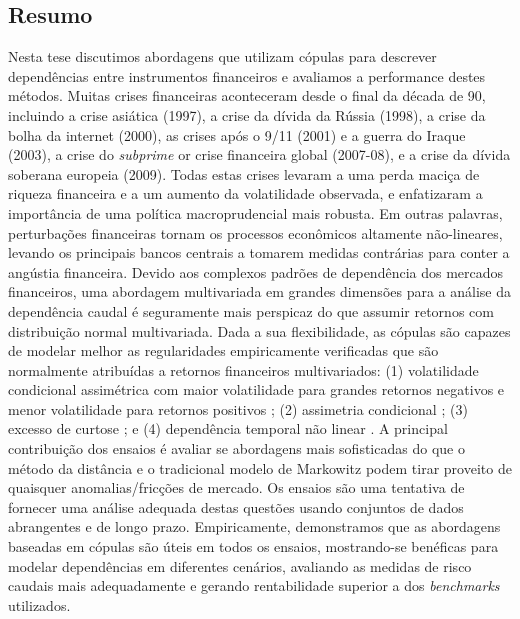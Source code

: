 \documentclass[a4paper,12pt]{report}
\begin{document}
		
	\thispagestyle{empty}
	
	\setlength{\baselineskip}{24pt}
	
	
	\clearpage
	
	
	
	\begin{center}
		\section*{Resumo}
	\end{center}
	\thispagestyle{empty}
	
	\setlength{\baselineskip}{12pt}
	\noindent Nesta tese discutimos abordagens que utilizam cópulas para descrever dependências entre instrumentos financeiros e avaliamos a performance destes métodos. Muitas crises financeiras aconteceram desde o final da década de 90, incluindo a crise asiática (1997), a crise da dívida da Rússia (1998), a crise da bolha da internet (2000), as crises após o 9/11 (2001) e a guerra do Iraque (2003), a crise do \emph{subprime} or crise financeira global (2007-08), e a crise da dívida soberana europeia (2009). Todas estas crises levaram a uma perda maciça de riqueza financeira e a um aumento da volatilidade observada, e enfatizaram a importância de uma política macroprudencial mais robusta. Em outras palavras, perturbações financeiras tornam os processos econômicos altamente não-lineares, levando os principais bancos centrais a tomarem medidas contrárias para conter a angústia financeira. Devido aos complexos padrões de dependência dos mercados financeiros, uma abordagem multivariada em grandes dimensões para a análise da dependência caudal é seguramente mais perspicaz do que assumir retornos com distribuição normal multivariada. Dada a sua flexibilidade, as cópulas são capazes de modelar melhor as regularidades empiricamente verificadas que são normalmente atribuídas a retornos financeiros multivariados: (1) volatilidade condicional assimétrica com maior volatilidade para grandes retornos negativos e menor volatilidade para retornos positivos \citep{h98}; (2) assimetria condicional \citep{ait01,chen01,patton01}; (3) excesso de curtose \citep{t01,andreou01}; e (4) dependência temporal não linear \citep{cont01,campbell97}. A principal contribuição dos ensaios é avaliar se abordagens mais sofisticadas do que o método da distância e o tradicional modelo de Markowitz podem tirar proveito de quaisquer anomalias/fricções de mercado. Os ensaios são uma tentativa de fornecer uma análise adequada destas questões usando conjuntos de dados abrangentes e de longo prazo. Empiricamente, demonstramos que as abordagens baseadas em cópulas são úteis em todos os ensaios, mostrando-se benéficas para modelar dependências em diferentes cenários, avaliando as medidas de risco caudais mais adequadamente e gerando rentabilidade superior a dos \emph{benchmarks} utilizados. \\
	
\end{document}

